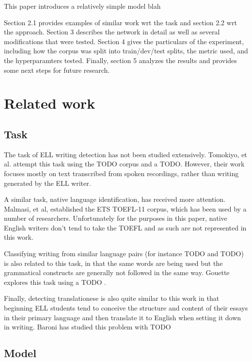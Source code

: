 \documentclass{article} %
\begin{document}
This paper introduces a relatively simple model blah

Section 2.1 provides examples of similar work wrt the task and section 2.2 wrt
the approach. Section 3 describes the network in detail as well as several
modifications that were tested. Section 4 gives the particulars of the
experiment, including how the corpus was split into train/dev/test splits, the
metric used, and the hyperparamters tested. Finally, section 5 analyzes the
results and provides some next steps for future research.

\section{Related work}

\subsection{Task}

The task of ELL writing detection has not been studied extensively. Tomokiyo, et al.
attempt this task using the TODO corpus and a TODO. \cite{tomokiyo}
However, their work focuses
mostly on text transcribed from spoken recordings, rather than writing generated
by the ELL writer.

A similar task, native language identification, has received more attention.
Malmasi, et al, established the ETS TOEFL-11 corpus, which has been used by a
number of researchers. \cite{malmasi} Unfortunately for the purposes in this
paper, native English writers don't tend to take the TOEFL and as such are not
represented in this work. \cite{ionescu}

Classifying writing from similar language pairs (for instance TODO and TODO) is
also related to this task, in that the same words are being used but the grammatical
constructs are generally not followed in the same way. Gouette explores this
task using a TODO . \cite{goutte}

Finally, detecting translationese is also quite similar to this work in that
beginning ELL students tend to conceive the structure and content of their essays
in their primary language and then translate it to English when setting it
down in writing. Baroni has studied this problem with TODO \cite{baroni}

\subsection{Model}
\end{document}
